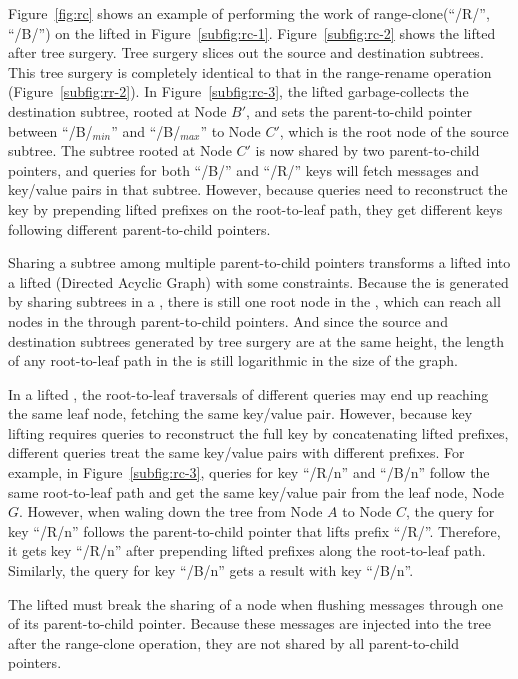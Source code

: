 Figure~\ref{fig:rc} shows an example of performing the work of
range-clone(``/R/'', ``/B/'') on the lifted \bet in Figure~\ref{subfig:rc-1}.
Figure~\ref{subfig:rc-2} shows the lifted \bet after tree surgery.
Tree surgery slices out the source and destination subtrees.
This tree surgery is completely identical to that in the range-rename operation
(Figure~\ref{subfig:rr-2}).
In Figure~\ref{subfig:rc-3}, the lifted \bet garbage-collects the destination
subtree, rooted at Node $B'$, and sets the parent-to-child pointer between
``/B/$_{min}$'' and ``/B/$_{max}$'' to Node $C'$,
which is the root node of the source subtree.
The subtree rooted at Node $C'$ is now shared by two parent-to-child pointers,
and queries for
both ``/B/'' and ``/R/'' keys will fetch messages and key/value pairs in that
subtree.
However, because queries need to reconstruct the key by prepending lifted
prefixes on the root-to-leaf path, they get different keys following different
parent-to-child pointers.

Sharing a subtree among multiple parent-to-child pointers transforms a lifted
\bet into a lifted \bedag (Directed Acyclic Graph) with some constraints.
Because the \bedag is generated by sharing subtrees in a \bet,
there is still one root node in the \bedag,
which can reach all nodes in the \bedag through parent-to-child pointers.
And since the source and destination subtrees generated by tree surgery are at
the same height, the length of any root-to-leaf path in the \bedag is still
logarithmic in the size of the graph.

In a lifted \bedag, the root-to-leaf traversals of different queries may end up
reaching the same leaf node, fetching the same key/value pair.
However, because key lifting requires queries to reconstruct the full key by
concatenating lifted prefixes, different queries treat the same key/value pairs
with different prefixes.
For example, in Figure~\ref{subfig:rc-3}, queries for key ``/R/n'' and ``/B/n''
follow the same root-to-leaf path and get the same key/value pair from the
leaf node, Node $G$.
However, when waling down the tree from Node $A$ to Node $C$, the query for
key ``/R/n'' follows the parent-to-child pointer that lifts prefix ``/R/''.
Therefore, it gets key ``/R/n'' after prepending lifted prefixes along the
root-to-leaf path.
Similarly, the query for key ``/B/n'' gets a result with key ``/B/n''.

The lifted \bedag must break the sharing of a node when flushing messages
through one of its parent-to-child pointer.
Because these messages are injected into the tree after the range-clone
operation, they are not shared by all parent-to-child pointers.

